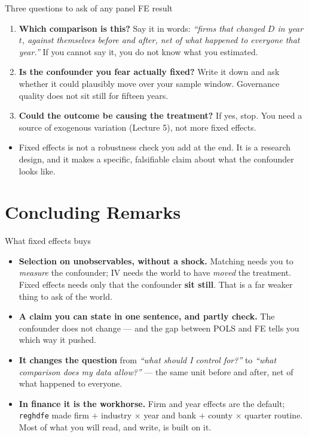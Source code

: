 \documentclass[
  11pt,
  ignorenonframetext,
  aspectratio=169,
]{beamer}
\providecommand{\tightlist}{%
  \setlength{\itemsep}{0pt}\setlength{\parskip}{0pt}}
\begin{document}
\begin{frame}{Three questions to ask of any panel FE result}
\protect{}\label{three-questions-to-ask-of-any-panel-fe-result}
\begin{enumerate}
\tightlist
\item
  \textbf{Which comparison is this?} Say it in words: \emph{``firms that
  changed \(D\) in year \(t\), against themselves before and after, net
  of what happened to everyone that year.''} If you cannot say it, you
  do not know what you estimated.
\item
  \textbf{Is the confounder you fear actually fixed?} Write it down and
  ask whether it could plausibly move over your sample window.
  Governance quality does not sit still for fifteen years.
\item
  \textbf{Could the outcome be causing the treatment?} If yes, stop. You
  need a source of exogenous variation (Lecture 5), not more fixed
  effects.
\end{enumerate}

\vspace{0.4em}

\begin{itemize}
\tightlist
\item
  Fixed effects is not a robustness check you add at the end. It is a
  research design, and it makes a specific, falsifiable claim about what
  the confounder looks like.
\end{itemize}
\end{frame}

\section{Concluding Remarks}\label{concluding-remarks}

\begin{frame}[fragile]{What fixed effects buys}
\protect{}\label{what-fixed-effects-buys}
\begin{itemize}
\tightlist
\item
  \textbf{Selection on unobservables, without a shock.} Matching needs
  you to \emph{measure} the confounder; IV needs the world to have
  \emph{moved} the treatment. Fixed effects needs only that the
  confounder \textbf{sit still}. That is a far weaker thing to ask of
  the world.
\item
  \textbf{A claim you can state in one sentence, and partly check.} The
  confounder does not change --- and the gap between POLS and FE tells
  you which way it pushed.
\item
  \textbf{It changes the question} from \emph{``what should I control
  for?''} to \emph{``what comparison does my data allow?''} --- the same
  unit before and after, net of what happened to everyone.
\item
  \textbf{In finance it is the workhorse.} Firm and year effects are the
  default; \texttt{reghdfe} made firm \(+\) industry \(\times\) year and
  bank \(+\) county \(\times\) quarter routine. Most of what you will
  read, and write, is built on it.
\end{itemize}
\end{frame}
\end{document}
